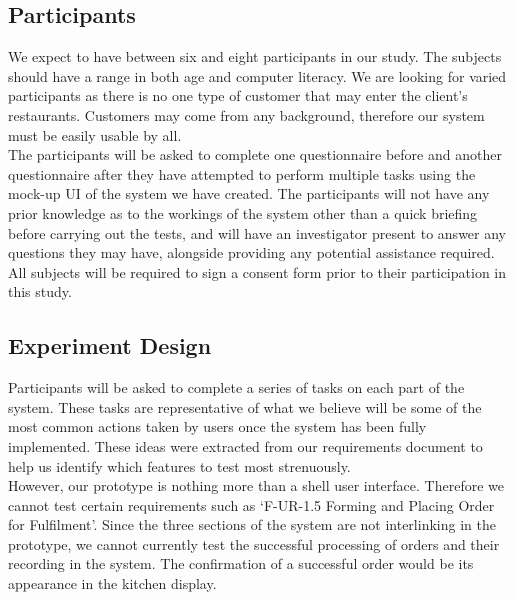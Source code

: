 \documentclass[11pt, a4paper]{report}
\begin{document}
\subsection{Participants} 
We   expect   to   have   between   six   and   eight   participants   in   our   study.   The   subjects should   have   a   range   in   both   age   and   computer   literacy.   We   are   looking   for   varied participants   as   there   is   no   one   type   of   customer   that   may   enter   the   client’s restaurants.   Customers   may   come   from   any   background,   therefore   our   system must   be   easily   usable   by   all.\\
The   participants   will   be   asked   to   complete   one   questionnaire   before   and   another questionnaire   after   they   have   attempted   to   perform   multiple   tasks   using   the mock-up   UI   of   the   system   we   have   created.   The   participants   will   not   have   any   prior knowledge   as   to   the   workings   of   the   system   other   than   a   quick   briefing   before carrying   out   the   tests,   and   will   have   an   investigator   present   to   answer   any questions   they   may   have,   alongside   providing   any   potential   assistance   required.   All subjects   will   be   required   to   sign   a   consent   form   prior   to   their   participation   in   this study.\\
\subsection{Experiment Design} 
Participants   will   be   asked   to   complete   a   series   of   tasks   on   each   part   of   the   system. These   tasks   are   representative   of   what   we   believe   will   be   some   of   the   most common   actions   taken   by   users   once   the   system   has   been   fully   implemented. These   ideas   were   extracted   from   our   requirements   document   to   help   us   identify which   features   to   test   most   strenuously.\\
However,   our   prototype   is   nothing   more   than   a   shell   user   interface.   Therefore   we cannot   test   certain   requirements   such   as   ‘F-UR-1.5   Forming   and   Placing   Order   for Fulfilment’.   Since   the   three   sections   of   the   system   are   not   interlinking   in   the prototype,   we   cannot   currently   test   the   successful   processing   of   orders   and   their recording   in   the   system.   The   confirmation   of   a   successful   order   would   be   its appearance   in   the   kitchen   display.
\end{document}
